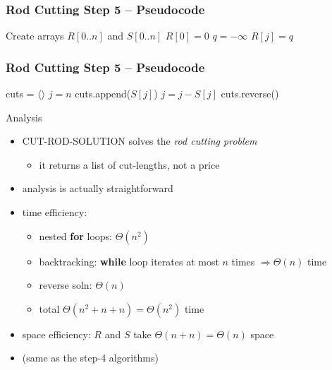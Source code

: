 \documentclass[10pt,aspectratio=169]{beamer}
\begin{document}
\begin{frame} \frametitle{Rod Cutting Step 5 -- Pseudocode}
  {\small
  \begin{algorithmic}[1]
    \State Create arrays $R[0..n]$ and $S[0..n]$
    \State $R[0] = 0$
      \State $q=-\infty$
        \EndIf
      \EndFor
      \State $R[j] = q$
    \EndFor
    \State {}
    \EndFunction
  \end{algorithmic}
  }
\end{frame}

\begin{frame} \frametitle{Rod Cutting Step 5 -- Pseudocode}
  {\small
  \begin{algorithmic}[1]
    \State cuts = $\langle \rangle$ 
    \State $j = n$ 
      \State cuts.append($S[j]$)
      \State $j = j - S[j]$
    \EndWhile
    \State cuts.reverse() 
    \State {}
    \EndFunction
  \end{algorithmic}
  }
\end{frame}

\begin{frame}{Analysis}
  \begin{itemize}
    \item CUT-ROD-SOLUTION solves the \emph{rod cutting problem}
    \begin{itemize}
      \item it returns a list of cut-lengths, not a price
    \end{itemize}
    \item analysis is actually straightforward
    \item time efficiency:
    \begin{itemize}
      \item nested \textbf{for} loops: $\Theta(n^2)$
      \item backtracking: \textbf{while} loop iterates at most $n$ times $\Rightarrow \Theta(n)$ time
      \item reverse soln: $\Theta(n)$
      \item total $\Theta(n^2+n+n)=\Theta(n^2)$ time
    \end{itemize}
    \item space efficiency: $R$ and $S$ take $\Theta(n+n)=\Theta(n)$ space
    \item (same as the step-4 algorithms)
  \end{itemize}
\end{frame}
\end{document}
